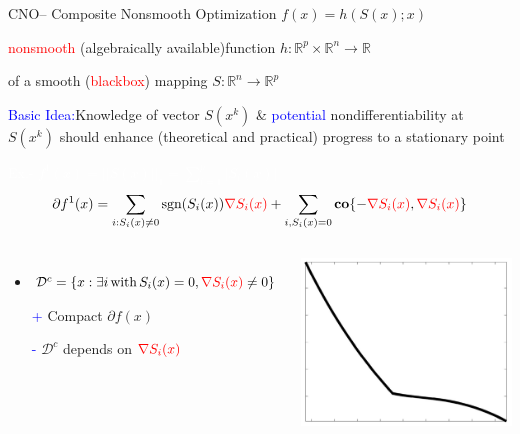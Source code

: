 \documentclass[handout,aspectratio=54]{beamer}
\numberwithin{theorem}{section}
\begin{document}
\begin{frame}{CNO– Composite Nonsmooth Optimization $f(x)=h(S(x);x)$}
\small
\begin{center}
\textcolor{red}{nonsmooth} (\textcolor[RGB]{0,130,80}{algebraically available})function $h:\mathbb{R}^p\times\mathbb{R}^n\rightarrow\mathbb{R}$

of a \textcolor[RGB]{0,130,80}{smooth} (\textcolor{red}{blackbox}) mapping $S:\mathbb{R}^n\rightarrow\mathbb{R}^p$
\end{center}

\textcolor{blue}{Basic Idea:}Knowledge of vector $S(x^k)$ \& \textcolor{blue}{potential} nondifferentiability at $S(x^k)$ should enhance (theoretical and practical) progress to a stationary point

\colorbox[rgb]{0.5,0.6,0.7}{\textcolor{white}{Ex.- $f^1(x)=||S(x)||_1=\sum_{i=1}^p|S_i(x)|$}}
\begin{equation*}
\partial f^1(x)=\sum_{i:S_i(x)\neq0}\textup{sgn}(S_i(x))\textcolor{red}{\nabla S_i(x)}+\sum_{i,S_i(x)=0}\textup{\textbf{co}}\{-\textcolor{red}{\nabla S_i(x)},\textcolor{red}{\nabla S_i(x)}\}
\end{equation*}

\begin{columns}
\begin{itemize}
\item $\mathcal{D}^c=\{x:\exists i \,\textup{with}\, S_i(x)=0,\textcolor{red}{\nabla S_i(x)}\neq0\}$
\item[\textcolor{blue}{+}] \textcolor[RGB]{0,130,80}{Compact} $\partial f(x)$
\item[\textcolor{blue}{-}] $\mathcal{D}^c$ depends on $\textcolor{red}{\nabla S_i(x)}$
\end{itemize}

\includegraphics[width=\textwidth]{fig/51.jpg}
\end{columns}
\end{frame}
\end{document}
